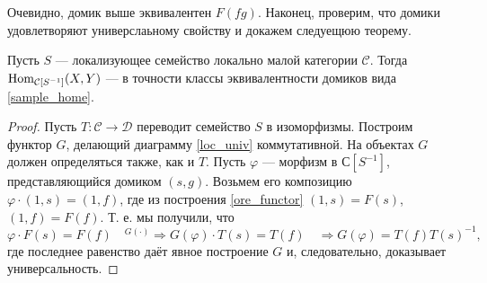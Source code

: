 \documentclass[../main.tex]{subfiles}
\begin{document}
Очевидно, домик выше эквивалентен $F(fg)$. Наконец, проверим, что домики удовлетворяют универслаьному свойству и докажем следуещюю теорему.
\begin{to_thr}
 Пусть $S$ --- локализующее семейство локально малой категории $\mathcal{C}$. Тогда $\operatorname{Hom}_{\mathcal{C}[S^{-1}]}(X, Y)$ --- в точности классы эквивалентности домиков вида \eqref{sample_home}.
 \label{ore_loc_desc}
 \end{to_thr}
 \begin{proof}
 Пусть $T:\mathcal{C}\to \mathcal{D}$ переводит семейство $S$ в изоморфизмы. Построим функтор $G$, делающий диаграмму \ref{loc_univ} коммутативной.
На объектах $G$ должен определяться также, как и $T$. Пусть $\varphi$ --- морфизм в $\mathcal{С}[S^{-1}]$, представляющийся домиком $(s, g)$.  Возьмем его композицию $\varphi\cdot (1, s) = (1, f)$, где из построения \eqref{ore_functor} $(1, s) = F(s)$, $(1, f) = F(f)$. Т. е. мы получили, что
\begin{equation*}
	\varphi\cdot F(s) = F(f)\quad {}^{G(\cdot)}
	 \Rightarrow G(\varphi)\cdot T(s) = T(f)\quad
	 \Rightarrow G(\varphi) = T(f)T(s)^{-1},
      \end{equation*}
где последнее равенство даёт явное построение $G$ и, следовательно, доказывает универсальность.
\end{proof}
\end{document}
